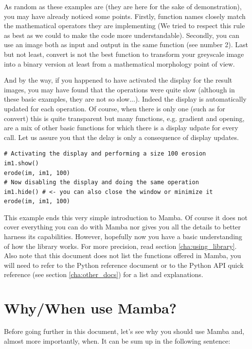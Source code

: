 \documentclass[a4paper,10pt,oneside]{article}
\begin{document}
As random as these examples are (they are here for the sake of demonstration),
you may have already noticed some points. Firstly, function names closely
match the mathematical operators they are implementing (We tried to respect this
rule as best as we could to make the code more understandable). Secondly, you can
use an image both as input and output in the same function (see number 2). Last
but not least, convert is not the best function to transform your greyscale image into
a binary version at least from a mathematical morphology point of view.

And by the way, if you happened to have activated the display for the result
images, you may have found that the operations were quite slow (although in these 
basic examples, they are not so slow...). Indeed the 
display is automatically updated for each operation. Of course, when there is
only one (such as for convert) this is quite transparent but many functions, 
e.g. gradient and opening, are a mix of other basic functions for which there is
a display udpate for every call. Let us assure you that the delay is only a
consequence of display updates.

\lstset{language=Python}
\begin{lstlisting}
# Activating the display and performing a size 100 erosion
im1.show()
erode(im, im1, 100)
# Now disabling the display and doing the same operation
im1.hide() # <- you can also close the window or minimize it
erode(im, im1, 100)
\end{lstlisting}

This example ends this very simple introduction to Mamba. Of course it does not
cover everything you can do with Mamba nor gives you all the details to better
harness its capabilities. However, hopefully now you have a basic understanding 
of how the library works. For more precision, read section \ref{cha:using_library}.
Also note that this document does not list the functions offered in Mamba, you
will need to refer to the Python reference document or to the Python API
quick reference (see section \ref{cha:other_docs}) for a list and explanations.

\pagebreak

\section{Why/When use Mamba?}

Before going further in this document, let's see why you should use Mamba and, 
almost more importantly, when. It can be sum up in the following sentence:
\end{document}
